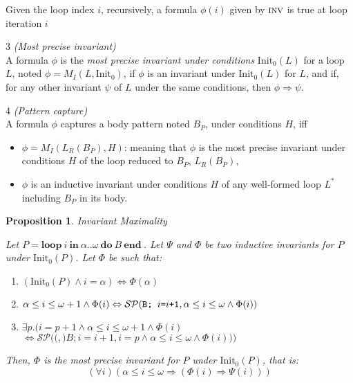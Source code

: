 \documentclass[a4paper,10pt]{article}
\newcommand{\idx}{\ensuremath{i}\xspace}
\newcommand{\idxinitial}{\ensuremath{\alpha}\xspace}
\newcommand{\idxfinal}{\ensuremath{\omega}\xspace}
\newcommand{\Init}{\ensuremath{\mathrm{Init_{0}}}}
\newcommand{\KWloop}{\ensuremath{\mathrm{\textbf{loop}}~}}
\newcommand{\KWdo}{\ensuremath{\mathrm{\textbf{do}}~}}
\newcommand{\KWend}{\ensuremath{\mathrm{\textbf{end}}~}}
\newcommand{\KWin}{\ensuremath{~\mathrm{\textbf{in}}~}}
\newcommand{\inv}{\ensuremath{\textsc{inv}}\xspace}
\newtheorem{proposition}[theorem]{Proposition}
\newenvironment{definition}[1][Definition]{\begin{trivlist}
\item[\hskip \labelsep {\bfseries #1}]}{\end{trivlist}}
\newcommand{\spostsym}{\ensuremath{\mathcal{SP}}\xspace}
\newcommand{\spost}[2]{\ensuremath{\spostsym(#1,#2)}}
\begin{document}
Given the loop index \idx, recursively, a formula $\phi(\idx)$ given by \inv 
is true at loop iteration \idx

\begin{definition} 3 \emph {(Most precise invariant)}\\
A formula $\phi$ is the \textit{most precise invariant under  conditions}
$\Init(L)$ for a loop $L$, noted $\phi = M_I(L, \Init)$, if $\phi$ is an invariant 
under $\Init(L)$ for $L$, and if, for any other invariant $\psi$ of $L$ under the 
same conditions, then $\phi \Rightarrow \psi$.
\end{definition}

\begin{definition} 4 \emph {(Pattern capture)}\\
A formula $\phi$ captures a body pattern noted $B_P$, under conditions $H$,  iff
\begin{itemize}
\item[i.]  $\phi = M_I(L_R(B_P),H)$: meaning that $\phi$ is the most precise invariant 
           under conditions $H$ of the loop reduced to $B_P$, $L_R(B_P)$, 
\item[ii.] $\phi$ is an inductive invariant under conditions $H$ of any well-formed loop $L^*$ 
           including $B_P$ in its body.
\end{itemize}
\end{definition}

\begin{proposition} \emph {Invariant Maximality}
\label{prop:maximality}

Let $P = \KWloop  \idx \KWin \idxinitial ..\idxfinal ~ \KWdo B ~
\KWend$. Let $\Psi$ and  $\Phi$ be two inductive invariants for $P$ under
$\Init(P)$. Let $\Phi$ be such that:
\begin{enumerate}
\item[(a)] $(\Init(P) \land \idx = \idxinitial) \Leftrightarrow \Phi(\idxinitial)$ \label{init-max}
\item[(b)] $ \idxinitial \leq \idx \leq \idxfinal+1 \land \Phi(\idx)
  \Leftrightarrow \spost{\texttt{B; \idx=\idx+1}}{\idxinitial \leq \idx \leq \idxfinal \land \Phi(\idx)}$ 
\ifdefined\longversion
\item[(b-bis)] $\exists p.( \idx=p+1 \land  \idxinitial \leq \idx \leq \idxfinal+ 1
  \land \Phi(\idx) $  \\
  $  \Leftrightarrow \spost(\texttt{B; \idx=\idx+1}, \idx=p \land \idxinitial \leq \idx \leq \idxfinal \land
  \Phi(\idx)))$ 
\fi
\end{enumerate}
\noindent Then, $\Phi$ is the most precise invariant for $P$ under $\Init(P)$, that is:
$$
(\forall \idx) (\idxinitial \leq \idx \leq \idxfinal \Rightarrow (\Phi(i) \Rightarrow \Psi(i)))  \label{max-stm}
$$
\end{proposition}
\end{document}
